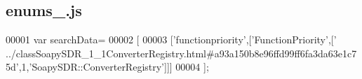 \subsection{enums\+\_.\+js}
\label{enums__0_8js_source}

\begin{DoxyCode}
00001 var searchData=
00002 [
00003   [\textcolor{stringliteral}{'functionpriority'},[\textcolor{stringliteral}{'FunctionPriority'},[\textcolor{stringliteral}{'
      ../classSoapySDR\_1\_1ConverterRegistry.html#a93a150b8e96ffd99ff6fa3da63e1c75d'},1,\textcolor{stringliteral}{'SoapySDR::ConverterRegistry'}]]]
00004 ];
\end{DoxyCode}
